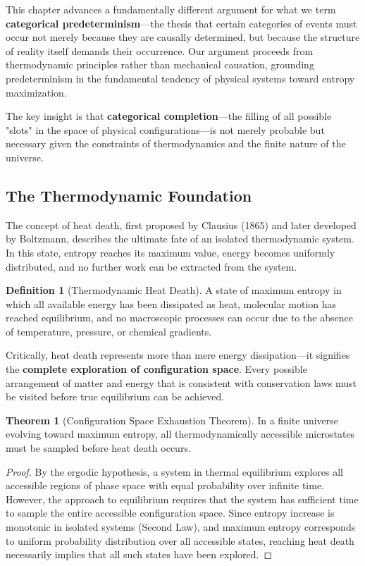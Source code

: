 \documentclass[12pt,a4paper]{article}
\theoremstyle{definition}
\newtheorem{definition}{Definition}[section]
\newtheorem{theorem}{Theorem}[section]
\begin{document}
{This chapter advances a fundamentally different argument for what we term \textbf{categorical predeterminism}—the thesis that certain categories of events must occur not merely because they are causally determined, but because the structure of reality itself demands their occurrence. Our argument proceeds from thermodynamic principles rather than mechanical causation, grounding predeterminism in the fundamental tendency of physical systems toward entropy maximization.

The key insight is that \textbf{categorical completion}—the filling of all possible "slots" in the space of physical configurations—is not merely probable but necessary given the constraints of thermodynamics and the finite nature of the universe.

\subsection{The Thermodynamic Foundation}

The concept of heat death, first proposed by Clausius (1865) and later developed by Boltzmann, describes the ultimate fate of an isolated thermodynamic system. In this state, entropy reaches its maximum value, energy becomes uniformly distributed, and no further work can be extracted from the system.

\begin{definition}[Thermodynamic Heat Death]
A state of maximum entropy in which all available energy has been dissipated as heat, molecular motion has reached equilibrium, and no macroscopic processes can occur due to the absence of temperature, pressure, or chemical gradients.
\end{definition}

Critically, heat death represents more than mere energy dissipation—it signifies the \textbf{complete exploration of configuration space}. Every possible arrangement of matter and energy that is consistent with conservation laws must be visited before true equilibrium can be achieved.

\begin{theorem}[Configuration Space Exhaustion Theorem]
In a finite universe evolving toward maximum entropy, all thermodynamically accessible microstates must be sampled before heat death occurs.
\end{theorem}

\begin{proof}
By the ergodic hypothesis, a system in thermal equilibrium explores all accessible regions of phase space with equal probability over infinite time. However, the approach to equilibrium requires that the system has sufficient time to sample the entire accessible configuration space. Since entropy increase is monotonic in isolated systems (Second Law), and maximum entropy corresponds to uniform probability distribution over all accessible states, reaching heat death necessarily implies that all such states have been explored.
\end{proof}

}
\end{document}
